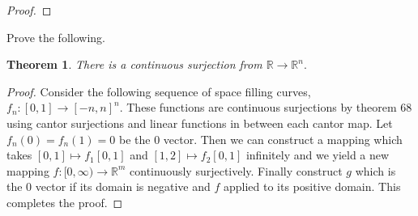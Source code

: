 \documentclass[letter]{article}
\newtheorem{theorem}{Theorem}
\newenvironment{menumerate}{%
  \edef\backupindent{\the\parindent}%
  \enumerate%
  \setlength{\parindent}{\backupindent}%
}{\endenumerate}
\begin{document}
\begin{menumerate}
\begin{proof}
		\end{proof}
	\item Prove the following.
		\begin{theorem}
			There is a continuous surjection from $\mathbb{R} \to \mathbb{R}^n.$ 
		\end{theorem}
		\begin{proof}
			Consider the following sequence of space filling curves, $f_n : [0,1] \to [-n,n]^n.$ These functions are continuous surjections by theorem $68$ using cantor surjections and linear functions in between each cantor map. Let $f_n(0) = f_n(1) = 0$ be the $0$ vector. Then we can construct a mapping which takes $[0,1] \mapsto f_1[0,1]$ and $[1,2] \mapsto f_2[0,1]$ infinitely and we yield a new mapping $f: [0,\infty) \to \mathbb{R}^m$ continuously surjectively. Finally construct $g$ which is the 0 vector if its domain is negative and $f$ applied to its positive domain. This completes the proof. 
		\end{proof}
	\setcounter{enumi}{107}
	\item
\end{menumerate}
\end{document}
